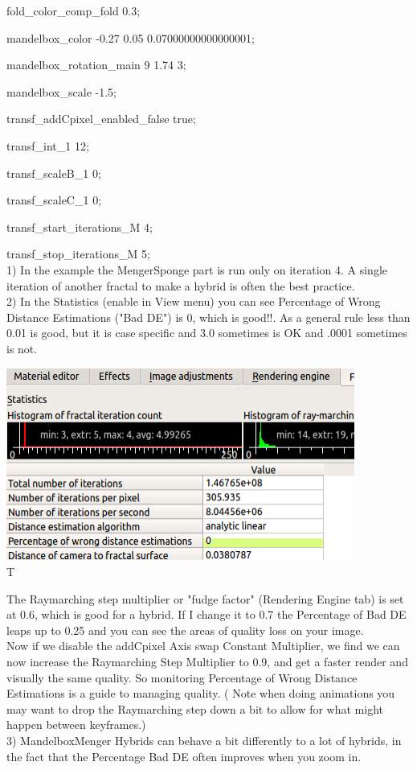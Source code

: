 fold\_color\_comp\_fold 0.3;

mandelbox\_color -0.27 0.05 0.07000000000000001;

mandelbox\_rotation\_main 9 1.74 3;

mandelbox\_scale -1.5;

transf\_addCpixel\_enabled\_false true;

transf\_int\_1 12;

transf\_scaleB\_1 0;

transf\_scaleC\_1 0;

transf\_start\_iterations\_M 4;

transf\_stop\_iterations\_M 5;\\[2\baselineskip]1) In the example the
MengerSponge part is run only on iteration 4. A single iteration of
another fractal to make a hybrid is often the best
practice.\\[2\baselineskip]2) In the Statistics (enable in View menu)
you can see Percentage of Wrong Distance Estimations ("Bad DE") is 0,
which is good!!. As a general rule less than 0.01 is good, but it is
case specific and 3.0 sometimes is OK and .0001 sometimes is not.

\includegraphics[width=4.51024in,height=2.48976in]{img/manual/media/image31.png}\\[2\baselineskip]T

The Raymarching step multiplier or "fudge factor" (Rendering Engine tab)
is set at 0.6, which is good for a hybrid. If I change it to 0.7 the
Percentage of Bad DE leaps up to 0.25 and you can see the areas of
quality loss on your image.\\[2\baselineskip]Now if we disable the
addCpixel Axis swap Constant Multiplier, we find we can now increase the
Raymarching Step Multiplier to 0.9, and get a faster render and visually
the same quality. So monitoring Percentage of Wrong Distance Estimations
is a guide to managing quality. ( Note when doing animations you may
want to drop the Raymarching step down a bit to allow for what might
happen between keyframes.)\\[2\baselineskip]3) MandelboxMenger Hybrids
can behave a bit differently to a lot of hybrids, in the fact that the
Percentage Bad DE often improves when you zoom in.

